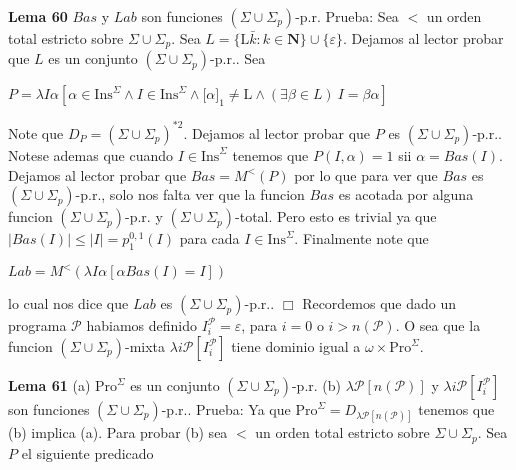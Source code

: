\textbf{Lema 60} \(Bas\) y \(Lab\) son funciones \((\Sigma \cup \Sigma _{p})\)-p.r.
Prueba: Sea \(< \) un orden total estricto sobre \(\Sigma \cup \Sigma _{p}\). Sea \(L=\{ \mathrm{L}\bar{k}:k\in \mathbf{N}\}\cup \{\varepsilon \}\). Dejamos al lector probar que \(L\) es un conjunto \((\Sigma \cup \Sigma _{p})\)-p.r.. Sea

\(\displaystyle P=\lambda I\alpha \left[ \alpha \in \mathrm{Ins}^{\Sigma }\wedge I\in \mathrm{Ins}^{\Sigma }\wedge \lbrack \alpha ]_{1}\neq \mathrm{L}\wedge (\exists \beta \in L)\ I=\beta \alpha \right] \)

Note que \(D_{P}=(\Sigma \cup \Sigma _{p})^{\ast 2}\). Dejamos al lector probar que \(P\) es \((\Sigma \cup \Sigma _{p})\)-p.r.. Notese ademas que cuando \(I\in \mathrm{Ins}^{\Sigma }\) tenemos que \(P(I,\alpha )=1\) sii \(\alpha =Bas(I)\). Dejamos al lector probar que \(Bas=M^{< }\left( P\right) \) por lo que para ver que \(Bas\) es \((\Sigma \cup \Sigma _{p})\)-p.r., solo nos falta ver que la funcion \(Bas\) es acotada por alguna funcion \((\Sigma \cup \Sigma _{p})\)-p.r. y \((\Sigma \cup \Sigma _{p})\)-total. Pero esto es trivial ya que \(\left\vert Bas(I)\right\vert \leq \left\vert I\right\vert =p_{1}^{0,1}(I)\) para cada \(I\in \mathrm{Ins}^{\Sigma }\).
Finalmente note que

\(\displaystyle Lab=M^{< }\left( \lambda I\alpha \left[ \alpha Bas(I)=I\right] \right) \)

lo cual nos dice que \(Lab\) es \((\Sigma \cup \Sigma _{p})\)-p.r.. \(\Box\)
Recordemos que dado un programa \(\mathcal{P}\) habiamos definido \(I_{i}^{ \mathcal{P}}=\varepsilon \), para \(i=0\) o \(i >n(\mathcal{P}).\) O sea que la funcion \((\Sigma \cup \Sigma _{p})\)-mixta \(\lambda i\mathcal{P}\left[ I_{i}^{ \mathcal{P}}\right] \) tiene dominio igual a \(\omega \times \mathrm{Pro} ^{\Sigma }\).




\textbf{Lema 61}
(a) \(\mathrm{Pro}^{\Sigma }\) es un conjunto \((\Sigma \cup \Sigma _{p}) \)-p.r.
(b) \(\lambda \mathcal{P}\left[ n(\mathcal{P})\right] \) y \(\lambda i \mathcal{P}\left[ I_{i}^{\mathcal{P}}\right] \) son funciones \((\Sigma \cup \Sigma _{p})\)-p.r..
Prueba: Ya que \(\mathrm{Pro}^{\Sigma }=D_{\lambda \mathcal{P}\left[ n(\mathcal{P}) \right] }\) tenemos que (b) implica (a). Para probar (b) sea \(< \) un orden total estricto sobre \(\Sigma \cup \Sigma _{p}\). Sea \(P\) el siguiente predicado

